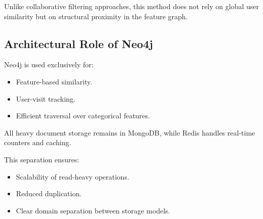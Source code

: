 Unlike collaborative filtering approaches,
this method does not rely on global user similarity
but on structural proximity in the feature graph.

\subsection{Architectural Role of Neo4j}

Neo4j is used exclusively for:

\begin{itemize}
    \item Feature-based similarity.
    \item User-visit tracking.
    \item Efficient traversal over categorical features.
\end{itemize}

All heavy document storage remains in MongoDB,
while Redis handles real-time counters and caching.

This separation ensures:

\begin{itemize}
    \item Scalability of read-heavy operations.
    \item Reduced duplication.
    \item Clear domain separation between storage models.
\end{itemize}
